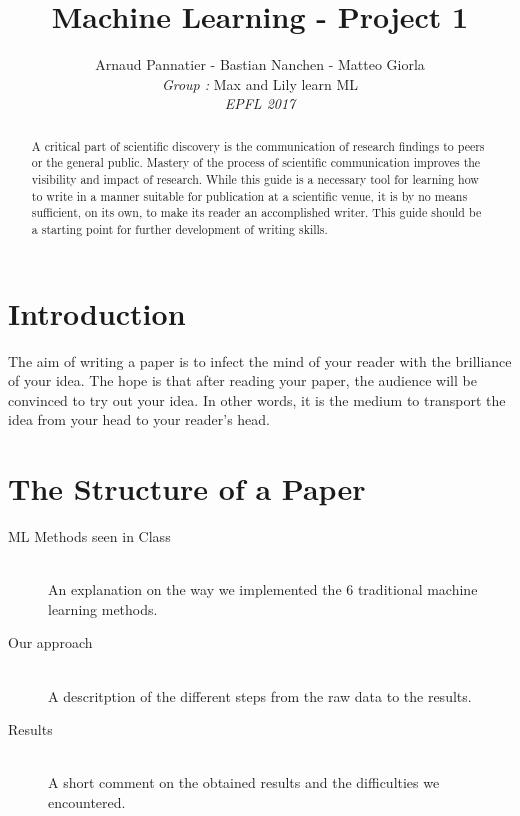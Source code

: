 \documentclass[10pt,conference,compsocconf]{IEEEtran}
\begin{document}
\title{Machine Learning - Project 1}
\author{
  Arnaud Pannatier - 
  Bastian Nanchen - 
  Matteo Giorla\\
  \textit{Group : }Max and Lily learn ML \\
  \textit{EPFL 2017}
}
\maketitle

\begin{abstract}
  A critical part of scientific discovery is the
  communication of research findings to peers or the general public.
  Mastery of the process of scientific communication improves the
  visibility and impact of research. While this guide is a necessary
  tool for learning how to write in a manner suitable for publication
  at a scientific venue, it is by no means sufficient, on its own, to
  make its reader an accomplished writer. 
  This guide should be a starting point for further development of 
  writing skills.
\end{abstract}

\section{Introduction}

The aim of writing a paper is to infect the mind of your reader with
the brilliance of your idea. 
The hope is that after reading your
paper, the audience will be convinced to try out your idea. In other
words, it is the medium to transport the idea from your head to your
reader's head.

\section{The Structure of a Paper}

\begin{description}
\item[ML Methods seen in Class] \ \\
  An explanation on the way we implemented the 6 traditional machine learning methods.
\item[Our approach] \ \\
  A descritption of the different steps from the raw data to the results.
\item[Results] \ \\
  A short comment on the obtained results and the difficulties we encountered.
\end{description}
\end{document}
